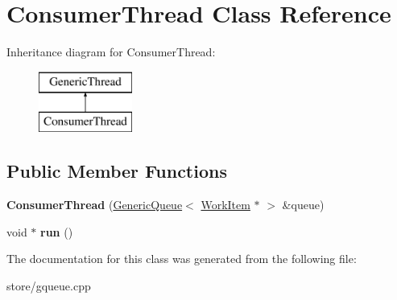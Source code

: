 \hypertarget{classConsumerThread}{\section{Consumer\-Thread Class Reference}
\label{classConsumerThread}
}
Inheritance diagram for Consumer\-Thread\-:\begin{figure}[H]
\begin{center}
\leavevmode
\includegraphics[height=2.000000cm]{classConsumerThread}
\end{center}
\end{figure}
\subsection*{Public Member Functions}
\begin{DoxyCompactItemize}
\item 
\hypertarget{classConsumerThread_a000214667d1ad9d31ce7133f6fbf9aac}{{\bfseries Consumer\-Thread} (\hyperlink{classGenericQueue}{Generic\-Queue}$<$ \hyperlink{classWorkItem}{Work\-Item} $\ast$ $>$ \&queue)}\label{classConsumerThread_a000214667d1ad9d31ce7133f6fbf9aac}

\item 
\hypertarget{classConsumerThread_a8fde7a9b6c2c0b3c62a9fd3c50296557}{void $\ast$ {\bfseries run} ()}\label{classConsumerThread_a8fde7a9b6c2c0b3c62a9fd3c50296557}

\end{DoxyCompactItemize}


The documentation for this class was generated from the following file\-:\begin{DoxyCompactItemize}
\item 
store/gqueue.\-cpp\end{DoxyCompactItemize}
